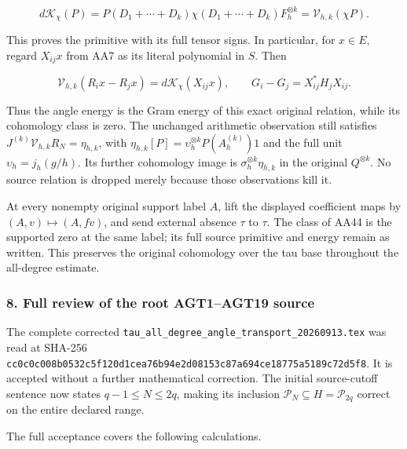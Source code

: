 \[
d\mathcal K_\chi(P)
=P(D_1+\cdots+D_k)\chi(D_1+\cdots+D_k)F_h^{\otimes k}
=\mathcal V_{h,k}(\chi P).
\tag{AA43}
\]

This proves the primitive with its full tensor signs. In particular, for \(x\in E\), regard \(X_{ij}x\) from AA7 as its literal polynomial in \(S\). Then

\[
\mathcal V_{h,k}(R_ix-R_jx)
=d\mathcal K_\chi(X_{ij}x),\qquad
G_i-G_j=X_{ij}^*H_jX_{ij}.
\tag{AA44}
\]

Thus the angle energy is the Gram energy of this exact original relation, while its cohomology class is zero. The unchanged arithmetic observation still satisfies \(J^{(k)}\mathcal V_{h,k}R_N=\eta_{h,k}\), with \(\eta_{h,k}[P]=\upsilon_h^{\otimes k}P(A_h^{(k)})1\) and the full unit \(\upsilon_h=j_h(g/h)\). Its further cohomology image is \(\sigma_h^{\otimes k}\eta_{h,k}\) in the original \(Q^{\otimes k}\). No source relation is dropped merely because those observations kill it.

At every nonempty original support label \(A\), lift the displayed coefficient maps by \((A,v)\mapsto(A,fv)\), and send external absence \(\tau\) to \(\tau\). The class of AA44 is the supported zero at the same label; its full source primitive and energy remain as written. This preserves the original cohomology over the tau base throughout the all-degree estimate.

\subsubsection{8. Full review of the root AGT1--AGT19 source}\label{endpoint-all_degree_angle_review--full-review-of-the-root-agt1agt19-source}

The complete corrected \nolinkurl{tau_all_degree_angle_transport_20260913.tex} was read at SHA-256 \nolinkurl{cc0c0c008b0532c5f120d1cea76b94e2d08153c87a694ce18775a5189c72d5f8}. It is accepted without a further mathematical correction. The initial source-cutoff sentence now states \(q-1\le N\le2q\), making its inclusion \(\mathcal P_N\subseteq H=\mathcal P_{2q}\) correct on the entire declared range.

The full acceptance covers the following calculations.

